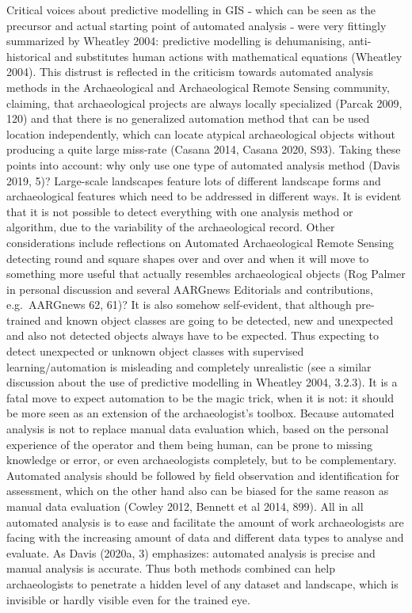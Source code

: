 \documentclass[
]{article}
\begin{document}
Critical voices about predictive modelling in GIS ˗ which can be seen as the precursor and actual starting point of automated analysis ˗ were very fittingly summarized by Wheatley 2004: predictive modelling is dehumanising, anti-historical and substitutes human actions with mathematical equations (Wheatley 2004). This distrust is reflected in the criticism towards automated analysis methods in the Archaeological and Archaeological Remote Sensing community, claiming, that archaeological projects are always locally specialized (Parcak 2009, 120) and that there is no generalized automation method that can be used location independently, which can locate atypical archaeological objects without producing a quite large miss-rate (Casana 2014, Casana 2020, S93). Taking these points into account: why only use one type of automated analysis method (Davis 2019, 5)? Large-scale landscapes feature lots of different landscape forms and archaeological features which need to be addressed in different ways. It is evident that it is not possible to detect everything with one analysis method or algorithm, due to the variability of the archaeological record. Other considerations include reflections on Automated Archaeological Remote Sensing detecting round and square shapes over and over and when it will move to something more useful that actually resembles archaeological objects (Rog Palmer in personal discussion and several AARGnews Editorials and contributions, e.g.~AARGnews 62, 61)?
It is also somehow self-evident, that although pre-trained and known object classes are going to be detected, new and unexpected and also not detected objects always have to be expected. Thus expecting to detect unexpected or unknown object classes with supervised learning/automation is misleading and completely unrealistic (see a similar discussion about the use of predictive modelling in Wheatley 2004, 3.2.3). It is a fatal move to expect automation to be the magic trick, when it is not: it should be more seen as an extension of the archaeologist's toolbox. Because automated analysis is not to replace manual data evaluation which, based on the personal experience of the operator and them being human, can be prone to missing knowledge or error, or even archaeologists completely, but to be complementary. Automated analysis should be followed by field observation and identification for assessment, which on the other hand also can be biased for the same reason as manual data evaluation (Cowley 2012, Bennett et al 2014, 899). All in all automated analysis is to ease and facilitate the amount of work archaeologists are facing with the increasing amount of data and different data types to analyse and evaluate. As Davis (2020a, 3) emphasizes: automated analysis is precise and manual analysis is accurate. Thus both methods combined can help archaeologists to penetrate a hidden level of any dataset and landscape, which is invisible or hardly visible even for the trained eye.
\end{document}
